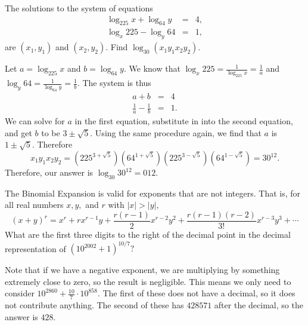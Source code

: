 \begin{question}[name={2002 AIME I, \href{https://artofproblemsolving.com/community/c4p378359}{Problem 6}}]
	The solutions to the system of equations
	\begin{eqnarray*} \log_{225}{x}+\log_{64}{y} &=& 4,\\ \log_x{225}-\log_y{64} &=& 1, \end{eqnarray*}
	are $(x_1,y_1)$ and $(x_2, y_2).$ Find $\log_{30}{(x_1y_1x_2y_2)}.$
\end{question}


\begin{solution}[name={Solution by joml88}]
	Let $a=\log_{225}{x}$ and $b=\log_{64}{y}.$ We know that $\log_x{225}=\frac 1{\log_{225}{x}}=\frac 1a$ and $\log_y{64}=\frac 1{\log_{64}{y}}=\frac 1b.$ The system is thus
	\begin{eqnarray*} a+b &=& 4\\ \frac 1a-\frac 1b &=& 1. \end{eqnarray*}
	We can solve for $a$ in the first equation, substitute in into the second equation, and get $b$ to be $3\pm\sqrt{5}$. Using the same procedure again, we find that $a$ is $1\pm\sqrt{5}.$ Therefore $$x_1y_1x_2y_2=\left(225^{3+\sqrt{5}}\right)\left(64^{1+\sqrt{5}}\right)\left(225^{3-\sqrt{5}}\right)\left(64^{1-\sqrt{5}}\right)=30^{12}.$$ Therefore, our answer is $\log_{30}{30^{12}}=\boxed{012}.$
\end{solution}












\begin{question}[name={2002 AIME I, \href{https://artofproblemsolving.com/community/c4p378371}{Problem 7}}]
	The Binomial Expansion is valid for exponents that are not integers. That is, for all real numbers $ x, y,$ and $ r$ with $ |x| > |y|,$
	\[ (x + y)^r = x^r + rx^{r - 1}y + \frac {r(r - 1)}2x^{r - 2}y^2 + \frac {r(r - 1)(r - 2)}{3!}x^{r - 3}y^3 + \cdots
	\]
	What are the first three digits to the right of the decimal point in the decimal representation of $ \left(10^{2002} + 1\right)^{10/7}?$
\end{question}


\begin{solution}[name={Solution by OlympusHero}]
	Note that if we have a negative exponent, we are multiplying by something extremely close to zero, so the result is negligible. This means we only need to consider $10^{2860}+\frac{10}{7} \cdot 10^{858}$. The first of these does not have a decimal, so it does not contribute anything. The second of these has $428571$ after the decimal, so the answer is $\boxed{428}$.
\end{solution}














